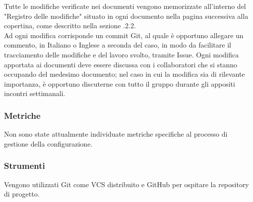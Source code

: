         Tutte le modifiche verificate nei documenti vengono memorizzate all'interno del "Registro delle modifiche" situato in ogni documento nella pagina successiva alla copertina, come descritto nella sezione .2.2.\\
        Ad ogni modifica corrisponde un commit Git, al quale è opportuno allegare un commento, in Italiano o Inglese a seconda del caso, in modo da facilitare il tracciamento delle modifiche e del lavoro svolto, tramite Issue.
        Ogni modifica apportata ai documenti deve essere discussa con i collaboratori che si stanno occupando del medesimo documento; nel caso in cui la modifica sia di rilevante importanza, è opportuno discuterne con tutto il gruppo durante gli appositi incontri settimanali.
      \subsubsection{Metriche}
      Non sono state attualmente individuate metriche specifiche al processo di gestione della configurazione.
      \subsubsection{Strumenti}
      Vengono utilizzati Git come VCS distribuito e GitHub per ospitare la repository di progetto.
